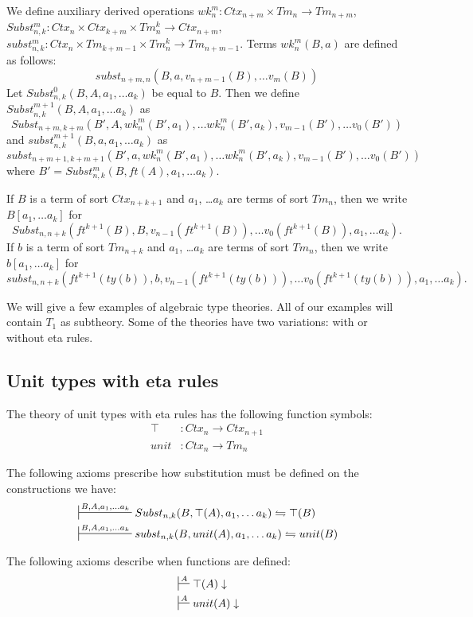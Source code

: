 \documentclass{amsart}
\theoremstyle{definition}
\theoremstyle{remark}
\numberwithin{figure}{section}
\begin{document}
We define auxiliary derived operations $wk^m_n : Ctx_{n+m} \times Tm_n \to Tm_{n+m}$, $Subst^m_{n,k} : Ctx_n \times Ctx_{k+m} \times Tm^k_n \to Ctx_{n+m}$, $subst^m_{n,k} : Ctx_n \times Tm_{k+m-1} \times Tm^k_n \to Tm_{n+m-1}$.
Terms $wk^m_n(B,a)$ are defined as follows:
\[ subst_{n+m,n}(B, a, v_{n+m-1}(B), \ldots v_m(B)) \]
Let $Subst^0_{n,k}(B, A, a_1, \ldots a_k)$ be equal to $B$.
Then we define $Subst^{m+1}_{n,k}(B, A, a_1, \ldots a_k)$ as
\[ Subst_{n+m,k+m}(B', A, wk^m_n(B',a_1), \ldots wk^m_n(B', a_k), v_{m-1}(B'), \ldots v_0(B')) \]
and $subst^{m+1}_{n,k}(B, a, a_1, \ldots a_k)$ as
\[ subst_{n+m+1,k+m+1}(B', a, wk^m_n(B', a_1), \ldots wk^m_n(B', a_k), v_{m-1}(B'), \ldots v_0(B')) \]
where $B' = Subst^m_{n,k}(B, ft(A), a_1, \ldots a_k)$.

If $B$ is a term of sort $Ctx_{n+k+1}$ and $a_1$, \ldots $a_k$ are terms of sort $Tm_n$, then we write $B[a_1, \ldots a_k]$ for
\[ Subst_{n,n+k}(ft^{k+1}(B), B, v_{n-1}(ft^{k+1}(B)), \ldots v_0(ft^{k+1}(B)), a_1, \ldots a_k). \]
If $b$ is a term of sort $Tm_{n+k}$ and $a_1$, \ldots $a_k$ are terms of sort $Tm_n$, then we write $b[a_1, \ldots a_k]$ for
\[ subst_{n,n+k}(ft^{k+1}(ty(b)), b, v_{n-1}(ft^{k+1}(ty(b))), \ldots v_0(ft^{k+1}(ty(b))), a_1, \ldots a_k). \]

We will give a few examples of algebraic type theories.
All of our examples will contain $T_1$ as subtheory.
Some of the theories have two variations: with or without eta rules.

\subsection{Unit types with eta rules}
The theory of unit types with eta rules has the following function symbols:
\begin{align*}
\top & : Ctx_n \to Ctx_{n+1} \\
unit & : Ctx_n \to Tm_n
\end{align*}

The following axioms prescribe how substitution must be defined on the constructions we have:
\begin{align*}
& \sststile{}{B, A, a_1, \ldots a_k} Subst_{n,k}(B, \top(A), a_1, \ldots a_k) \leftrightharpoons \top(B) \\
& \sststile{}{B, A, a_1, \ldots a_k} subst_{n,k}(B, unit(A), a_1, \ldots a_k) \leftrightharpoons unit(B)
\end{align*}

The following axioms describe when functions are defined:
\begin{align*}
& \sststile{}{A} \top(A) \downarrow \\
& \sststile{}{A} unit(A) \downarrow
\end{align*}
\end{document}

